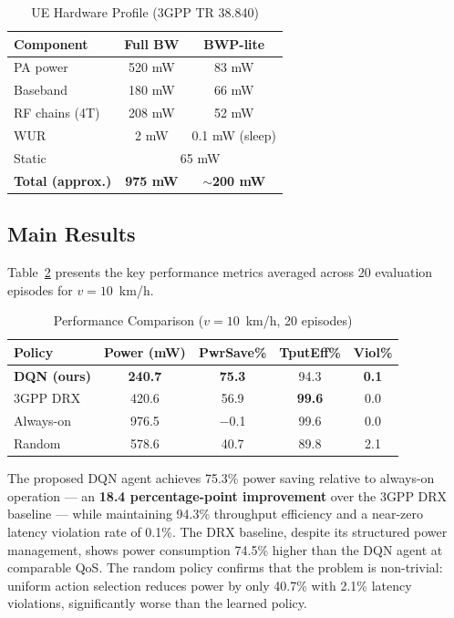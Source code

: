 \documentclass[conference]{IEEEtran}
\begin{document}
\begin{table}[t]
  \centering
  \caption{UE Hardware Profile (3GPP TR 38.840)}
  \label{tab:hw}
  \begin{tabular}{lcc}
    \toprule
    Component & Full BW & BWP-lite \\
    \midrule
    PA power              & 520 mW & 83 mW \\
    Baseband              & 180 mW & 66 mW \\
    RF chains (4T)        & 208 mW & 52 mW \\
    WUR                   & 2 mW   & 0.1 mW (sleep) \\
    Static                & \multicolumn{2}{c}{65 mW} \\
    \midrule
    \textbf{Total (approx.)} & \textbf{975 mW} & \textbf{$\sim$200 mW} \\
    \bottomrule
  \end{tabular}
\end{table}

\subsection{Main Results}

Table~\ref{tab:main_results} presents the key performance metrics
averaged across 20 evaluation episodes for $v = 10$~km/h.

\begin{table}[t]
  \centering
  \caption{Performance Comparison ($v = 10$~km/h, 20 episodes)}
  \label{tab:main_results}
  \begin{tabular}{lcccc}
    \toprule
    Policy & Power (mW) & PwrSave\% & TputEff\% & Viol\% \\
    \midrule
    \textbf{DQN (ours)} & \textbf{240.7} & \textbf{75.3} & 94.3 & \textbf{0.1} \\
    3GPP DRX            & 420.6          & 56.9          & \textbf{99.6} & 0.0 \\
    Always-on           & 976.5          & $-$0.1        & 99.6 & 0.0 \\
    Random              & 578.6          & 40.7          & 89.8 & 2.1 \\
    \bottomrule
  \end{tabular}
\end{table}

The proposed DQN agent achieves 75.3\% power saving relative to always-on
operation — an \textbf{18.4 percentage-point improvement} over the 3GPP
DRX baseline — while maintaining 94.3\% throughput efficiency and a
near-zero latency violation rate of 0.1\%.
The DRX baseline, despite its structured power management, shows
power consumption 74.5\% higher than the DQN agent at comparable QoS.
The random policy confirms that the problem is non-trivial:
uniform action selection reduces power by only 40.7\% with 2.1\%
latency violations, significantly worse than the learned policy.
\end{document}
